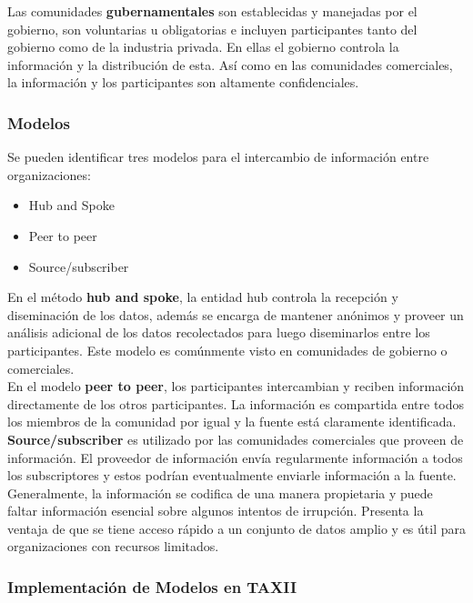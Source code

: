 Las comunidades \textbf{gubernamentales} son establecidas y manejadas por el gobierno, 
son voluntarias u obligatorias e incluyen participantes tanto del gobierno como 
de la industria privada. En ellas el gobierno controla la información y la 
distribución de esta. Así como en las comunidades comerciales, la información y 
los participantes son altamente confidenciales.\\

\subsubsection{Modelos}

Se pueden identificar tres modelos para el intercambio de información entre 
organizaciones:
\begin{itemize}
  \item Hub and Spoke
  \item Peer to peer
  \item Source/subscriber
\end{itemize}

En el método \textbf{hub and spoke}, la entidad hub controla la recepción y diseminación 
de los datos, además se encarga de mantener anónimos y proveer un análisis 
adicional de los datos recolectados para luego diseminarlos entre los 
participantes. Este modelo es comúnmente visto en comunidades de gobierno o comerciales.\\

En el modelo \textbf{peer to peer}, los participantes intercambian y reciben información 
directamente de los otros participantes. La información es compartida entre 
todos los miembros de la comunidad por igual y la fuente está claramente 
identificada.\\

\textbf{Source/subscriber} es utilizado por las 
comunidades comerciales que proveen de información. El proveedor de información 
envía regularmente información a todos los subscriptores y estos podrían 
eventualmente enviarle información a la fuente. Generalmente, la información se 
codifica de una manera propietaria y puede faltar información esencial sobre 
algunos intentos de irrupción. Presenta la ventaja de que se tiene acceso rápido 
a un conjunto de datos amplio y es útil para organizaciones con recursos 
limitados.\\

\subsubsection{Implementación de Modelos en TAXII}

